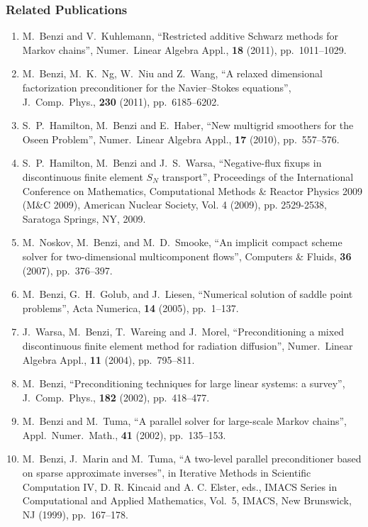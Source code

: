 \subsubsection*{Related Publications}
\begin{enumerate}
\parskip = -2pt

\item M.~Benzi and V.~Kuhlemann, ``Restricted additive Schwarz methods
  for Markov chains'', Numer.~Linear Algebra Appl., {\bf 18} (2011), 
  pp.~1011--1029.
  
\item M.~Benzi, M.~K.~Ng, W.~Niu and Z.~Wang, ``A relaxed dimensional
  factorization preconditioner for the Navier--Stokes equations'', 
  J.~Comp.~Phys., {\bf 230} (2011), pp.~6185--6202. 
  
\item S.~P.~Hamilton, M.~Benzi and E.~Haber, ``New multigrid
  smoothers for the Oseen Problem'', Numer.~Linear Algebra Appl., {\bf 17}
  (2010), pp.~557--576. 
  
\item S.~P.~Hamilton, M.~Benzi and J.~S.~Warsa, ``Negative-flux fixups in 
  discontinuous finite element $S_N$ transport'', 
  Proceedings of the International Conference on Mathematics, 
  Computational Methods \& Reactor Physics 2009 (M\&C 2009), 
  American Nuclear Society, Vol. 4 (2009), pp. 2529-2538, 
  Saratoga Springs, NY, 2009.
  
\item M.~Noskov, M.~Benzi, and M.~D.~Smooke, ``An implicit compact 
  scheme solver for two-dimensional multicomponent flows'', Computers 
  \& Fluids, {\bf 36} (2007), pp.~376--397. 
  
\item M.~Benzi, G.~H.~Golub, and J.~Liesen, ``Numerical solution of 
  saddle point problems'', Acta Numerica, {\bf 14} (2005), pp.~1--137.
  
\item J.~Warsa, M.~Benzi, T.~Wareing and J.~Morel, ``Preconditioning a 
  mixed discontinuous finite element method for radiation diffusion'', 
  Numer.~Linear Algebra Appl., {\bf 11} (2004), pp.~795--811. 
  
\item M.~Benzi, ``Preconditioning techniques for large linear systems:
  a survey'', J.~Comp.~Phys., {\bf 182} (2002), pp.~418--477.
  
\item M.~Benzi and M.~Tuma, 
  ``A parallel solver for large-scale Markov chains'',
  Appl.~Numer.~Math., {\bf 41} (2002), pp.~135--153. 
  
\item M.~Benzi, J.~Marin and M.~Tuma, ``A two-level parallel preconditioner
  based on sparse approximate inverses'', in Iterative Methods in Scientific 
  Computation IV, D. R. Kincaid and A. C. Elster, eds., IMACS Series in 
  Computational and Applied Mathematics, Vol.~5, IMACS, New Brunswick, 
  NJ (1999), pp.~167--178. 

\end{enumerate}

